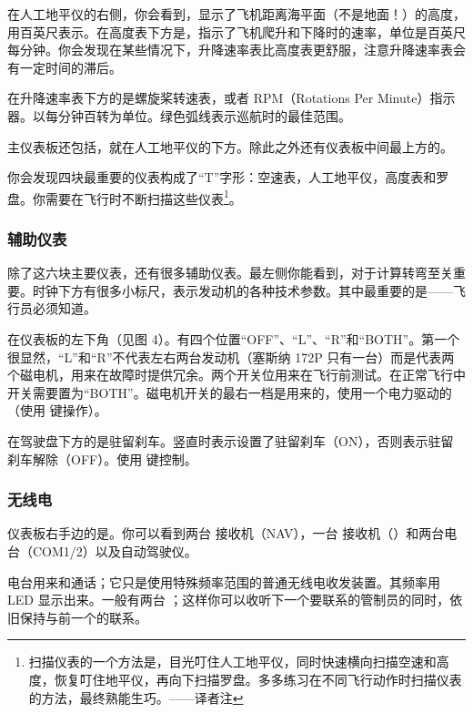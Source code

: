 \begin{itemize}
在人工地平仪的右侧，你会看到，显示了飞机距离海平面（不是地面！）的高度，用百英尺表示。在高度表下方是，指示了飞机爬升和下降时的速率，单位是百英尺每分钟。你会发现在某些情况下，升降速率表比高度表更舒服，注意升降速率表会有一定时间的滞后。

在升降速率表下方的是螺旋桨转速表，或者 RPM（Rotations Per Minute）指示器。以每分钟百转为单位。绿色弧线表示巡航时的最佳范围。

主仪表板还包括，就在人工地平仪的下方。除此之外还有仪表板中间最上方的。

你会发现四块最重要的仪表构成了“T”字形：空速表，人工地平仪，高度表和罗盘。你需要在飞行时不断扫描这些仪表\footnote{扫描仪表的一个方法是，目光叮住人工地平仪，同时快速横向扫描空速和高度，恢复叮住地平仪，再向下扫描罗盘。多多练习在不同飞行动作时扫描仪表的方法，最终熟能生巧。——译者注}。

\subsubsection{辅助仪表}

除了这六块主要仪表，还有很多辅助仪表。最左侧你能看到，对于计算转弯至关重要。时钟下方有很多小标尺，表示发动机的各种技术参数。其中最重要的是——飞行员必须知道。

在仪表板的左下角（见图 4）。有四个位置“OFF”、“L”、“R”和“BOTH”。第一个很显然，“L”和“R”不代表左右两台发动机（塞斯纳 172P 只有一台）而是代表两个磁电机，用来在故障时提供冗余。两个开关位用来在飞行前测试。在正常飞行中开关需要置为“BOTH”。磁电机开关的最右一档是用来的，使用一个电力驱动的（使用  键操作）。

在驾驶盘下方的是驻留刹车。竖直时表示设置了驻留刹车（ON），否则表示驻留刹车解除（OFF）。使用  键控制。

\subsubsection{无线电}

仪表板右手边的是。你可以看到两台  接收机（NAV），一台  接收机（）和两台电台（COM1/2）以及自动驾驶仪。

电台用来和通话；它只是使用特殊频率范围的普通无线电收发装置。其频率用 LED 显示出来。一般有两台 ；这样你可以收听下一个要联系的管制员的同时，依旧保持与前一个的联系。


\end{itemize}
